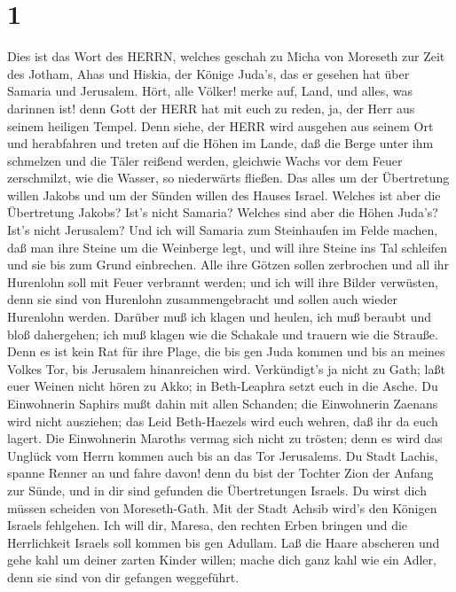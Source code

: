 \hypertarget{section}{%
\section{1}\label{section}}

 Dies ist das Wort des HERRN, welches geschah zu Micha von
Moreseth zur Zeit des Jotham, Ahas und Hiskia, der Könige Juda's, das er
gesehen hat über Samaria und Jerusalem.  Hört, alle Völker!
merke auf, Land, und alles, was darinnen ist! denn Gott der HERR hat mit
euch zu reden, ja, der Herr aus seinem heiligen Tempel. 
Denn siehe, der HERR wird ausgehen aus seinem Ort und herabfahren und
treten auf die Höhen im Lande,  daß die Berge unter ihm
schmelzen und die Täler reißend werden, gleichwie Wachs vor dem Feuer
zerschmilzt, wie die Wasser, so niederwärts fließen.  Das
alles um der Übertretung willen Jakobs und um der Sünden willen des
Hauses Israel. Welches ist aber die Übertretung Jakobs? Ist's nicht
Samaria? Welches sind aber die Höhen Juda's? Ist's nicht Jerusalem?
 Und ich will Samaria zum Steinhaufen im Felde machen, daß
man ihre Steine um die Weinberge legt, und will ihre Steine ins Tal
schleifen und sie bis zum Grund einbrechen.  Alle ihre
Götzen sollen zerbrochen und all ihr Hurenlohn soll mit Feuer verbrannt
werden; und ich will ihre Bilder verwüsten, denn sie sind von Hurenlohn
zusammengebracht und sollen auch wieder Hurenlohn werden. 
Darüber muß ich klagen und heulen, ich muß beraubt und bloß dahergehen;
ich muß klagen wie die Schakale und trauern wie die Strauße.
 Denn es ist kein Rat für ihre Plage, die bis gen Juda
kommen und bis an meines Volkes Tor, bis Jerusalem hinanreichen wird.
 Verkündigt's ja nicht zu Gath; laßt euer Weinen nicht
hören zu Akko; in Beth-Leaphra setzt euch in die Asche.  Du
Einwohnerin Saphirs mußt dahin mit allen Schanden; die Einwohnerin
Zaenans wird nicht ausziehen; das Leid Beth-Haezels wird euch wehren,
daß ihr da euch lagert.  Die Einwohnerin Maroths vermag
sich nicht zu trösten; denn es wird das Unglück vom Herrn kommen auch
bis an das Tor Jerusalems.  Du Stadt Lachis, spanne Renner
an und fahre davon! denn du bist der Tochter Zion der Anfang zur Sünde,
und in dir sind gefunden die Übertretungen Israels.  Du
wirst dich müssen scheiden von Moreseth-Gath. Mit der Stadt Achsib
wird's den Königen Israels fehlgehen.  Ich will dir,
Maresa, den rechten Erben bringen und die Herrlichkeit Israels soll
kommen bis gen Adullam.  Laß die Haare abscheren und gehe
kahl um deiner zarten Kinder willen; mache dich ganz kahl wie ein Adler,
denn sie sind von dir gefangen weggeführt.

